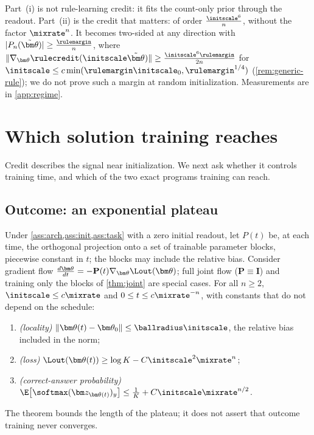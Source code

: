 Part~(i) is not rule-learning credit: it fits the count-only prior through the readout. Part~(ii) is the credit that matters:
of order $\frac{\initscale^6}{n}$, without the factor $\mixrate^n$. It becomes two-sided at any direction with
$|P_n(\tilde{\bm\theta})|\ge\frac{\rulemargin}{n}$, where $\|\nabla_{\bm\theta}\rulecredit(\initscale\tilde{\bm\theta})\|\ge\frac{\initscale^6\rulemargin}{2n}$ for
$\initscale\le c\min(\rulemargin\initscale_0,\rulemargin^{1/4})$ (\cref{rem:generic-rule}); we do not prove such a margin at random
initialization. Measurements are in \cref{app:regime}.

\section{Which solution training reaches}
\label{sec:reach}

Credit describes the signal near initialization. We next ask whether it controls training time, and which of the two exact programs training can reach.

\subsection{Outcome: an exponential plateau}

\begin{theorem}
\label{thm:outcome-end}
Under \cref{ass:arch,ass:init,ass:task} with a zero initial readout, let $P(t)$ be, at each time, the orthogonal projection onto a set
of trainable parameter blocks, piecewise constant in $t$; the blocks may include the relative bias. Consider gradient flow
$\tfrac{d\bm\theta}{dt}=-\mathbf P(t)\nabla_{\bm\theta}\Lout(\bm\theta)$; full joint flow ($\mathbf P\equiv\mathbf I$) and training only the blocks of \cref{thm:joint} are special cases.
For all $n\ge2$, $\initscale\le c\mixrate$ and $0\le t\le c\mixrate^{-n}$, with constants that do not depend on the schedule:
\begin{enumerate}[label=(\roman*),leftmargin=*,itemsep=0pt,topsep=2pt]
\item \emph{(locality)} $\|\bm\theta(t)-\bm\theta_0\|\le\ballradius\initscale$, the relative bias included in the norm;
\item \emph{(loss)} $\Lout(\bm\theta(t))\ge\log K-C\initscale^2\mixrate^n$;
\item \emph{(correct-answer probability)} $\E\bigl[\softmax(\bm z_{\bm\theta(t)})_y\bigr]\le\frac{1}{K}+C\initscale\mixrate^{n/2}$.
\end{enumerate}
\end{theorem}
The theorem bounds the length of the plateau; it does not assert that outcome training never converges.

